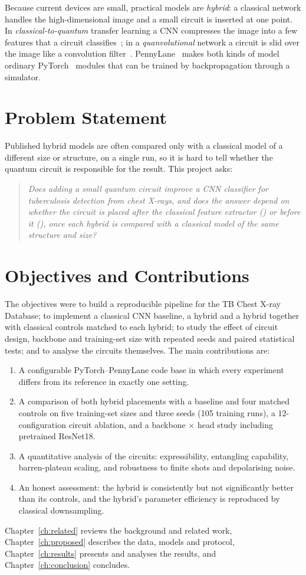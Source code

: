 Because current devices are small, practical models are \emph{hybrid}: a
classical network handles the high-dimensional image and a small circuit is
inserted at one point. In \emph{classical-to-quantum} transfer learning a
CNN compresses the image into a few features that a circuit
classifies~\cite{mari2020}; in a \emph{quanvolutional} network a circuit is
slid over the image like a convolution filter~\cite{henderson2020}.
PennyLane~\cite{bergholm2018} makes both kinds of model ordinary
PyTorch~\cite{paszke2019} modules that can be trained by backpropagation
through a simulator.

\section{Problem Statement}
Published hybrid models are often compared only with a classical model of
a different size or structure, on a single run, so it is hard to tell
whether the quantum circuit is responsible for the result. This project
asks:

\begin{quote}
\emph{Does adding a small quantum circuit improve a CNN classifier for
tuberculosis detection from chest X-rays, and does the answer depend on
whether the circuit is placed after the classical feature extractor (\cq)
or before it (\qc), once each hybrid is compared with a classical model of
the same structure and size?}
\end{quote}

\section{Objectives and Contributions}
The objectives were to build a reproducible pipeline for the TB Chest X-ray
Database; to implement a classical CNN baseline, a \cq{} hybrid and a \qc{}
hybrid together with classical controls matched to each hybrid; to study
the effect of circuit design, backbone and training-set size with repeated
seeds and paired statistical tests; and to analyse the circuits themselves.
The main contributions are:
\begin{enumerate}
  \item A configurable PyTorch--PennyLane code base in which every
        experiment differs from its reference in exactly one setting.
  \item A comparison of both hybrid placements with a baseline and four
        matched controls on five training-set sizes and three seeds
        (105 training runs), a 12-configuration circuit ablation, and a
        backbone $\times$ head study including pretrained ResNet18.
  \item A quantitative analysis of the circuits: expressibility,
        entangling capability, barren-plateau scaling, and robustness to
        finite shots and depolarising noise.
  \item An honest assessment: the \cq{} hybrid is consistently but not
        significantly better than its controls, and the \qc{} hybrid's
        parameter efficiency is reproduced by classical downsampling.
\end{enumerate}

Chapter~\ref{ch:related} reviews the background and related work,
Chapter~\ref{ch:proposed} describes the data, models and protocol,
Chapter~\ref{ch:results} presents and analyses the results, and
Chapter~\ref{ch:conclusion} concludes.
